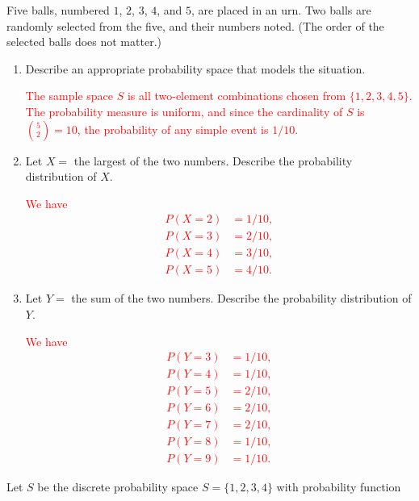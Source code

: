 \documentclass[12pt,reqno]{amsart}
\begin{document}
\bigskip
\prob Five balls, numbered $1$, $2$, $3$, $4$, and $5$, are placed in an urn. Two balls are randomly selected from the five, and their numbers noted. (The order of the selected balls does not matter.)

\medskip
\begin{enumerate}
    \item Describe an appropriate probability space that models the situation.
    
    \bigskip
    \textcolor{red}{The sample space $S$ is all two-element combinations chosen from $\{1,2,3,4,5\}$. The probability measure is uniform, and since the cardinality of $S$ is $\binom{5}{2} = 10$, the probability of any simple event is $1/10$.}
    \bigskip

    \item Let $X = $ the largest of the two numbers. Describe the probability distribution of $X$.
    
    \bigskip
    \textcolor{red}{We have
    \begin{align*}
    P(X=2) &= 1/10, \\
    P(X=3) &= 2/10, \\
    P(X=4) &= 3/10, \\
    P(X=5) &= 4/10.
    \end{align*}}
    \bigskip

    \item Let $Y = $ the sum of the two numbers. Describe the probability distribution of $Y$.
    
    \bigskip
    \textcolor{red}{We have
    \begin{align*}
    P(Y=3) &= 1/10, \\
    P(Y=4) &= 1/10, \\
    P(Y=5) &= 2/10, \\
    P(Y=6) &= 2/10, \\
    P(Y=7) &= 2/10, \\
    P(Y=8) &= 1/10, \\
    P(Y=9) &= 1/10.
    \end{align*}}
\end{enumerate}















\bigskip
\prob Let $S$ be the discrete probability space $S = \{1,2,3,4\}$ with probability function
\end{document}
